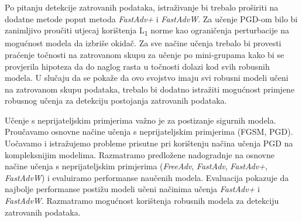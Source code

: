\documentclass[times, utf8, zavrsni, numeric]{fer}
\begin{document}
Po pitanju detekcije zatrovanih podataka, istraživanje bi trebalo proširiti na dodatne metode poput metoda \textit{FastAdv+} i \textit{FastAdvW}.
Za učenje PGD-om bilo bi zanimljivo proučiti utjecaj korištenja L\textsubscript{1} norme kao ograničenja perturbacije na mogućnost modela da izbriše okidač.
Za sve načine učenja trebalo bi provesti praćenje točnosti na zatrovanom skupu za učenje po mini-grupama kako bi se provjerila hipoteza da do naglog rasta u točnosti dolazi kod svih robusnih modela.
U slučaju da se pokaže da ovo svojstvo imaju svi robusni modeli učeni na zatrovanom skupu podataka, trebalo bi dodatno istražiti mogućnost primjene robusnog učenja za detekciju postojanja zatrovanih podataka.




\begin{sazetak}

Učenje s neprijateljskim primjerima važno je za postizanje sigurnih modela. 
Proučavamo osnovne načine učenja s neprijateljskim primjerima (FGSM, PGD). 
Uočavamo i istražujemo probleme prisutne pri korištenju načina učenja PGD na kompleksnijim modelima.
Razmatramo predložene nadogradnje na osnovne načine učenja s neprijateljskim primjerima (\textit{FreeAdv}, \textit{FastAdv}, \textit{FastAdv+}, \textit{FastAdvW}) i evaluiramo performanse naučenih modela.
Evaluacija pokazuje da najbolje performanse postižu modeli učeni načinima učenja \textit{FastAdv+} i \textit{FastAdvW}.
Razmatramo mogućnost korištenja robusnih modela za detekciju zatrovanih podataka.

\end{sazetak}
\end{document}
